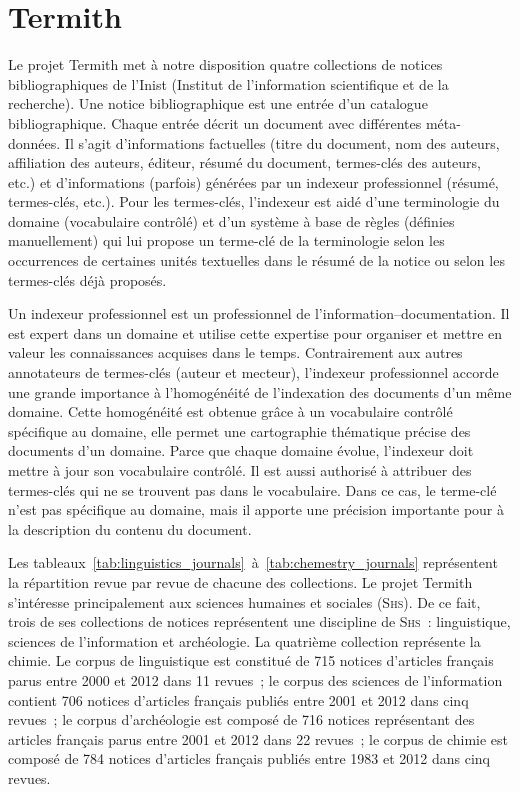   \section{Termith}
  \label{sec:main-data_description-termith_data}
    Le projet Termith met à notre disposition quatre collections de notices
    bibliographiques de l'Inist (Institut de l'information scientifique et de la
    recherche). Une notice bibliographique est une entrée d'un catalogue
    bibliographique. Chaque entrée décrit un document avec différentes
    méta-données. Il s'agit d'informations factuelles (titre du document, nom
    des auteurs, affiliation des auteurs, éditeur, résumé du document,
    termes-clés des auteurs, etc.) et d'informations (parfois) générées par un
    indexeur professionnel (résumé, termes-clés, etc.). Pour les termes-clés,
    l'indexeur est aidé d'une terminologie du domaine (vocabulaire contrôlé) et
    d'un système à base de règles (définies manuellement) qui lui propose un
    terme-clé de la terminologie selon les occurrences de certaines unités
    textuelles dans le résumé de la notice ou selon les termes-clés déjà
    proposés.

    Un indexeur professionnel est un professionnel de
    l'information--documentation. Il est expert dans un domaine et utilise cette
    expertise pour organiser et mettre en valeur les connaissances acquises dans
    le temps. Contrairement aux autres annotateurs de termes-clés (auteur et
    mecteur), l'indexeur professionnel accorde une grande importance à
    l'homogénéité de l'indexation des documents d'un même domaine. Cette
    homogénéité est obtenue grâce à un vocabulaire contrôlé spécifique au
    domaine, elle permet une cartographie thématique précise des documents d'un
    domaine. Parce que chaque domaine évolue, l'indexeur  doit mettre à jour son
    vocabulaire contrôlé. Il est aussi authorisé à attribuer des termes-clés qui
    ne se trouvent pas dans le vocabulaire. Dans ce cas, le terme-clé n'est pas
    spécifique au domaine, mais il apporte une précision importante pour à la
    description du contenu du document. 
    
    Les tableaux~\ref{tab:linguistics_journals}~à~\ref{tab:chemestry_journals}
    représentent la répartition revue par revue de chacune des collections. Le
    projet Termith s'intéresse principalement aux sciences humaines et sociales
    (\textsc{Shs}). De ce fait, trois de ses collections de notices représentent
    une discipline de \textsc{Shs}~: linguistique, sciences de l'information et
    archéologie. La quatrième collection représente la chimie. Le corpus de
    linguistique est constitué de 715 notices d'articles français parus entre
    2000 et 2012 dans 11 revues~; le corpus des sciences de l'information
    contient 706 notices d'articles français publiés entre 2001 et 2012 dans
    cinq revues~; le corpus d'archéologie est composé de 716 notices
    représentant des articles français parus entre 2001 et 2012 dans 22 revues~;
    le corpus de chimie est composé de 784 notices d'articles français publiés
    entre 1983 et 2012 dans cinq revues.

